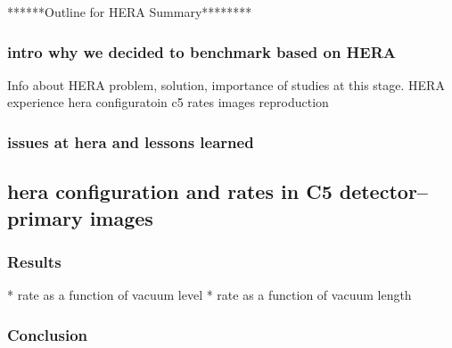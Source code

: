 ******Outline for HERA Summary********

\subsubsection{intro why we decided to benchmark based on HERA}
Info about HERA problem, solution, importance of studies at this stage.
HERA experience 
hera configuratoin c5 rates images
reproduction

\subsubsection{issues at hera and lessons learned}
\subsection{hera configuration and rates in C5 detector-- primary images}

\subsubsection{Results}
* rate as a function of vacuum level
* rate as a function of vacuum length
\subsubsection{Conclusion}